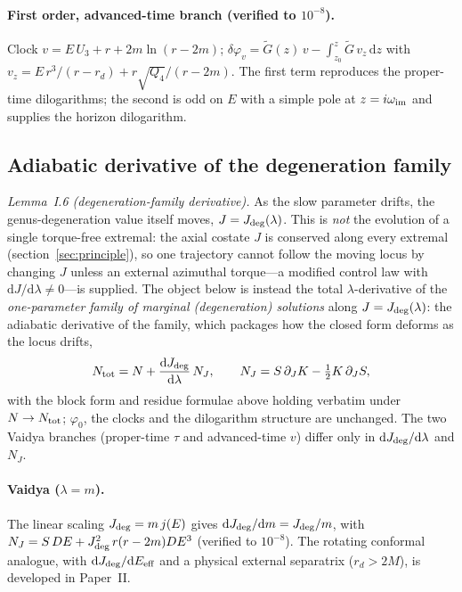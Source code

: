 \documentclass[12pt]{iopart}
\newcommand{\Jc}{J_{\rm deg}}
\newcommand{\dd}{\mathrm{d}}
\begin{document}
\paragraph{First order, advanced-time branch (verified to $10^{-8}$).}
Clock $v=E\,U_3+r+2m\ln(r-2m)$;
$\delta\varphi_v=\tilde G(z)\,v-\int_{z_0}^z\tilde G\,v_z\,\dd z$ with
$v_z=E\,r^3/(r-r_d)+r\sqrt{Q_4}/(r-2m)$. The first term reproduces the proper-time
dilogarithms; the second is odd on $E$ with a simple pole at $z=i\omega_{\rm im}$ and
supplies the horizon dilogarithm.

\subsection{Adiabatic derivative of the degeneration family}
\label{app:tracking}
\emph{Lemma~I.6 (degeneration-family derivative).} As the slow parameter drifts, the genus-degeneration value itself moves, $J=\Jc(\lambda)$. This is \emph{not} the evolution of a single torque-free extremal:
the axial costate $J$ is conserved along every extremal
(section~\ref{sec:principle}), so one trajectory cannot follow the moving locus by
changing $J$ unless an external azimuthal torque---a modified control law with
$\dd J/\dd\lambda\neq0$---is supplied. The object below is instead the total
$\lambda$-derivative of the \emph{one-parameter family of marginal (degeneration)
solutions} along $J=\Jc(\lambda)$: the adiabatic derivative of the family, which
packages how the closed form deforms as the locus drifts,
\begin{equation}
N_{\rm tot}=N+\frac{\dd\Jc}{\dd\lambda}\,N_J,\qquad
N_J=S\,\partial_JK-\tfrac12K\,\partial_JS,
\label{eq:Ntot-track}
\end{equation}
with the block form and residue formulae above holding verbatim under $N\to N_{\rm tot}$;
$\varphi_0$, the clocks and the dilogarithm structure are unchanged. The two Vaidya
branches (proper-time $\tau$ and advanced-time $v$) differ only in $\dd\Jc/\dd\lambda$
and $N_J$.

\paragraph{Vaidya ($\lambda=m$).}
The linear scaling $\Jc=m\,j(E)$ gives $\dd\Jc/\dd m=\Jc/m$, with
$N_J=S\,DE+\Jc^2\,r(r-2m)DE^3$ (verified to $10^{-8}$). The rotating conformal analogue,
with $\dd\Jc/\dd E_{\rm eff}$ and a physical external separatrix ($r_d>2M$), is developed
in Paper~II.
\end{document}
